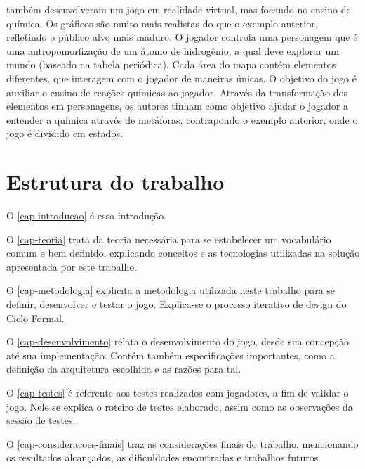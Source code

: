 \cite{Alves:2015:VR_Quimica} também desenvolveram um jogo em realidade 
virtual, mas focando no ensino de química. Os gráficos são muito mais 
realistas do que o exemplo anterior, refletindo o público alvo mais 
maduro. O jogador controla uma personagem que é uma antropomorfização 
de um átomo de hidrogênio, a qual deve explorar um mundo (baseado 
na tabela periódica). Cada área do mapa contém elementos 
diferentes, que interagem com o jogador de maneiras únicas. O objetivo 
do jogo é auxiliar o ensino de reações químicas ao jogador. Através 
da transformação dos elementos em personagens, os autores tinham como 
objetivo ajudar o jogador a entender a química através de metáforas, 
contrapondo o exemplo anterior, onde o jogo é dividido em estados.


\section{Estrutura do trabalho}\label{sec-estrutura-documento}

O \autoref{cap-introducao} é essa introdução.

O \autoref{cap-teoria} trata da teoria necessária para se 
estabelecer um vocabulário comum e bem definido, explicando 
conceitos e as tecnologias utilizadas na solução apresentada 
por este trabalho.

O \autoref{cap-metodologia} explicita a metodologia utilizada 
neste trabalho para se definir, desenvolver e testar o jogo. 
Explica-se o processo iterativo de design do Ciclo Formal.

O \autoref{cap-desenvolvimento} relata o desenvolvimento do 
jogo, desde sua concepção até sua implementação. Contém 
também especificações importantes, como a definição da 
arquitetura escolhida e as razões para tal.

O \autoref{cap-testes} é referente aos testes realizados com 
jogadores, a fim de validar o jogo. Nele se explica o roteiro 
de testes elaborado, assim como as observações da sessão de testes.

O \autoref{cap-consideracoes-finais} traz as considerações 
finais do trabalho, mencionando os resultados alcançados, 
as dificuldades encontradas e trabalhos futuros.
